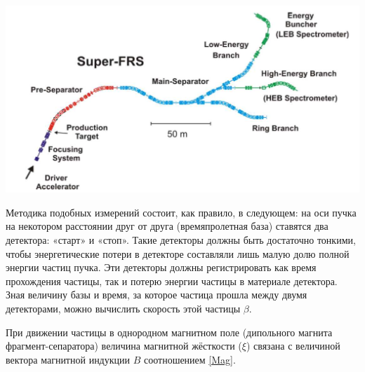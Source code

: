 
{
	\centering
	\includegraphics[width=1\linewidth]{FRS.png}
	\label{ris:FRS}
}


Методика подобных измерений состоит, как правило, в следующем: на оси пучка на некотором расстоянии друг от друга (времяпролетная база) ставятся два детектора: «старт» и «стоп». Такие детекторы должны быть достаточно тонкими, чтобы энергетические потери в детекторе составляли лишь малую долю полной энергии частиц пучка. Эти детекторы должны регистрировать как время прохождения частицы, так и потерю энергии частицы в материале детектора. Зная величину базы и время, за которое частица прошла между двумя детекторами, можно вычислить скорость этой частицы $\beta$. 

При движении частицы в однородном магнитном поле (дипольного магнита фрагмент-сепаратора) величина магнитной жёсткости ($\xi$) связана с величиной вектора магнитной индукции $B$ соотношением \ref{Mag}.

%

